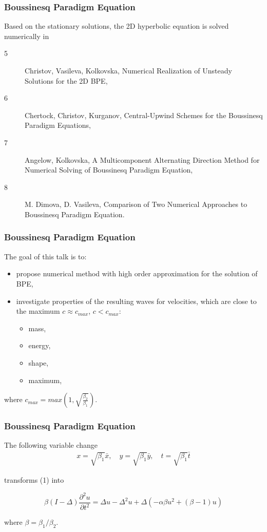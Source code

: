 \documentclass{beamer}
\newcommand{\be}{\begin{equation}}
\newcommand{\ee}{\end{equation}}
\begin{document}

\begin{frame}
\frametitle{Boussinesq Paradigm Equation}


Based on the stationary solutions, the 2D hyperbolic equation is solved numerically in 
\begin{description}
 \item[5] Christov, Vasileva, Kolkovska, Numerical Realization of Unsteady Solutions for the 2D BPE,
 \item[6] Chertock, Christov, Kurganov, Central-Upwind Schemes for the Boussinesq Paradigm Equations, 
  \item[7] Angelow, Kolkovska, A Multicomponent Alternating Direction Method for Numerical Solving of Boussinesq Paradigm Equation,
\item[8] M. Dimova, D. Vasileva, Comparison of Two Numerical Approaches to Boussinesq Paradigm Equation.
\end{description}
\end{frame}


\begin{frame}
\frametitle{Boussinesq Paradigm Equation}

The goal of this talk is to:
\begin{itemize}
 \item propose numerical method with high order approximation for the solution of BPE,
 \item investigate properties of the resulting waves for velocities, which are close to the maximum $c \approx c_{max}$, $c < c_{max}$:
	\begin{itemize}
	 \item mass,
	 \item energy,
	 \item shape,
	 \item maximum,
	\end{itemize}
\end{itemize}
where $c_{max} = max(1, \sqrt{ \frac{\beta_2}{\beta_1} } )$.
\end{frame}



\begin{frame}
\frametitle{Boussinesq Paradigm Equation}
The following variable change
\begin{align}
x = \sqrt{\beta_1} \bar{x}, \quad y = \sqrt{\beta_1} \bar{y}, \quad t = \sqrt{\beta_1} \bar{t}
\end{align}

transforms (1) into 

\be\label{problemVC}
\beta(I-\Delta) \frac{\partial^2 u}{\partial t^2}=
  \Delta u -\Delta^2 u +\Delta(-\alpha \beta u^2 + (\beta - 1 )u)
\ee

where $\beta = \beta_1/\beta_2$.

\end{frame}
\end{document}
